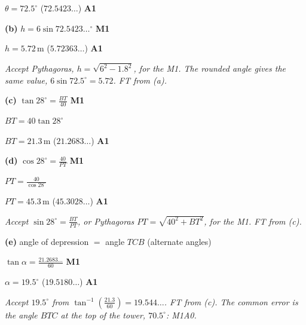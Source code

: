 \documentclass[12pt, twoside]{article}
\begin{document}
\begin{enumerate}[itemsep=0.3cm]
\begin{minipage}[t]{0.68\linewidth}
$\theta = 72.5^\circ$ \quad ($72.5423\ldots$) \hfill \textbf{A1}

\textbf{(b)} $h = 6 \sin 72.5423\ldots^\circ$ \hfill \textbf{M1}

$h = 5.72\,\text{m}$ \quad ($5.72363\ldots$) \hfill \textbf{A1}

\emph{Accept Pythagoras, $h = \sqrt{6^{2} - 1.8^{2}}$, for the M1. The
rounded angle gives the same value, $6 \sin 72.5^\circ = 5.72$. FT from (a).}
\end{minipage}
\hfill
\begin{minipage}[t]{0.28\linewidth}
\vspace{0pt}
\end{minipage}

\textbf{(c)} $\tan 28^\circ = \frac{BT}{40}$ \hfill \textbf{M1}

$BT = 40 \tan 28^\circ$

$BT = 21.3\,\text{m}$ \quad ($21.2683\ldots$) \hfill \textbf{A1}

\textbf{(d)} $\cos 28^\circ = \frac{40}{PT}$ \hfill \textbf{M1}

$PT = \frac{40}{\cos 28^\circ}$

$PT = 45.3\,\text{m}$ \quad ($45.3028\ldots$) \hfill \textbf{A1}

\emph{Accept $\sin 28^\circ = \frac{BT}{PT}$, or Pythagoras
$PT = \sqrt{40^{2} + BT^{2}}$, for the M1. FT from (c).}

\textbf{(e)} angle of depression $=$ angle $TCB$ (alternate angles)

$\tan\alpha = \frac{21.2683\ldots}{60}$ \hfill \textbf{M1}

$\alpha = 19.5^\circ$ \quad ($19.5180\ldots$) \hfill \textbf{A1}

\emph{Accept $19.5^\circ$ from $\tan^{-1}\left(\frac{21.3}{60}\right) =
19.544\ldots$. FT from (c). The common error is the angle $BTC$ at the
top of the tower, $70.5^\circ$: M1A0.}

\end{enumerate}
\end{document}
